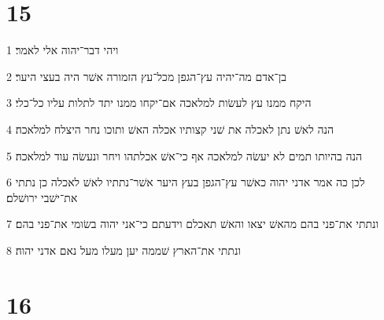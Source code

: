 \chapter{15}

\par 1 ויהי דבר־יהוה אלי לאמר׃
\par 2 בן־אדם מה־יהיה עץ־הגפן מכל־עץ הזמורה אשׁר היה בעצי היער׃
\par 3 היקח ממנו עץ לעשׂות למלאכה אם־יקחו ממנו יתד לתלות עליו כל־כלי׃
\par 4 הנה לאשׁ נתן לאכלה את שׁני קצותיו אכלה האשׁ ותוכו נחר היצלח למלאכה׃
\par 5 הנה בהיותו תמים לא יעשׂה למלאכה אף כי־אשׁ אכלתהו ויחר ונעשׂה עוד למלאכה׃
\par 6 לכן כה אמר אדני יהוה כאשׁר עץ־הגפן בעץ היער אשׁר־נתתיו לאשׁ לאכלה כן נתתי את־ישׁבי ירושׁלם׃
\par 7 ונתתי את־פני בהם מהאשׁ יצאו והאשׁ תאכלם וידעתם כי־אני יהוה בשׂומי את־פני בהם׃
\par 8 ונתתי את־הארץ שׁממה יען מעלו מעל נאם אדני יהוה׃

\chapter{16}

